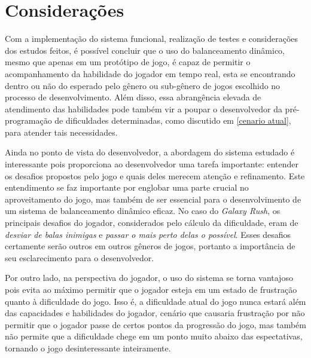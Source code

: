 \section{Considerações}

Com a implementação do sistema funcional, realização de testes e considerações dos estudos feitos, é possível concluir que o uso do balanceamento dinâmico, mesmo que apenas em um protótipo de jogo, é capaz de permitir o acompanhamento da habilidade do jogador em tempo real, esta se encontrando dentro ou não do esperado pelo gênero ou sub-gênero de jogos escolhido no processo de desenvolvimento. Além disso, essa abrangência elevada de atendimento das habilidades pode também vir a poupar o desenvolvedor da pré-programação de dificuldades determinadas, como discutido em \ref{cenario atual}, para atender tais necessidades.

Ainda no ponto de vista do desenvolvedor, a abordagem do sistema estudado é interessante pois proporciona ao desenvolvedor uma tarefa importante: entender os desafios propostos pelo jogo e quais deles merecem atenção e refinamento. Este entendimento se faz importante por englobar uma parte crucial no aproveitamento do jogo, mas também de ser essencial para o desenvolvimento de um sistema de balanceamento dinâmico eficaz. No caso do \textit{Galaxy Rush}, os principais desafios do jogador, considerados pelo cálculo da dificuldade, eram de \textit{desviar de balas inimigas} e \textit{passar o mais perto delas o possível}. Esses desafios certamente serão outros em outros gêneros de jogos, portanto a importância de seu esclarecimento para o desenvolvedor.

Por outro lado, na perspectiva do jogador, o uso do sistema se torna vantajoso pois evita ao máximo permitir que o jogador esteja em um estado de frustração quanto à dificuldade do jogo. Isso é, a dificuldade atual do jogo nunca estará além das capacidades e habilidades do jogador, cenário que causaria frustração por não permitir que o jogador passe de certos pontos da progressão do jogo, mas também não permite que a dificuldade chege em um ponto muito abaixo das espectativas, tornando o jogo desinteressante inteiramente.